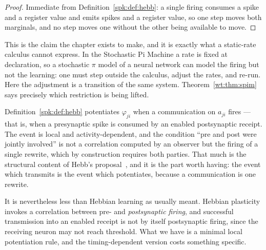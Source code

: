 \begin{proof}
Immediate from Definition~\ref{spk:def:hebb}: a single firing consumes a spike and a
register value and emits spikes and a register value, so one step moves both marginals,
and no step moves one without the other being available to move.
\end{proof}

This is the claim the chapter exists to make, and it is exactly what a static-rate
calculus cannot express. In the Stochastic Pi Machine a rate is fixed at declaration, so
a stochastic $\pi$ model of a neural network can model the firing but not the learning:
one must step outside the calculus, adjust the rates, and re-run. Here the adjustment is
a transition of the same system. Theorem~\ref{wt:thm:spim} says precisely which
restriction is being lifted.

\begin{remark}
\label{spk:rmk:hebbian}
Definition~\ref{spk:def:hebb} potentiates $\varphi_{ji}$ when a communication on $a_{ji}$
fires --- that is, when a presynaptic spike is consumed by an enabled postsynaptic
receipt. The event is local and activity-dependent, and the condition ``pre and post were
jointly involved'' is not a correlation computed by an observer but the firing of a
single rewrite, which by construction requires both parties. That much is the structural
content of Hebb's proposal~\cite{hebb}, and it is the part worth having: the event which
transmits is the event which potentiates, because a communication is one rewrite.

It is nevertheless less than Hebbian learning as usually meant. Hebbian plasticity
invokes a correlation between pre- and \emph{postsynaptic firing}, and successful
transmission into an enabled receipt is not by itself postsynaptic firing, since the
receiving neuron may not reach threshold. What we have is a minimal local potentiation
rule, and the timing-dependent version costs something specific.
\end{remark}

